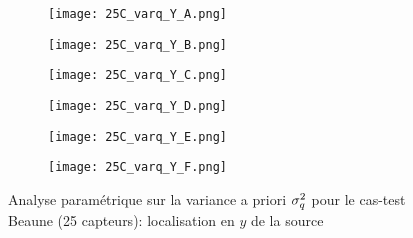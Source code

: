 \begin{figure}[p!]
	\centering
	\begin{subfigure}[t]{0.5\textwidth}
		\centering
		\texttt{[image: 25C\_varq\_Y\_A.png]}
		\caption{}
		\label{varq_A_y}
	\end{subfigure}%
	\begin{subfigure}[t]{0.5\textwidth}
		\centering
		\texttt{[image: 25C\_varq\_Y\_B.png]}
		\caption{}
		\label{varq_B_y}
	\end{subfigure}
	\begin{subfigure}[t]{0.5\textwidth}
		\centering
		\texttt{[image: 25C\_varq\_Y\_C.png]}
		\caption{}
		\label{varq_C_y}
	\end{subfigure}%
	\begin{subfigure}[t]{0.5\textwidth}
		\centering
		\texttt{[image: 25C\_varq\_Y\_D.png]}
		\caption{}
		\label{varq_D_y}
	\end{subfigure}
	\begin{subfigure}[t]{0.5\textwidth}
		\centering
		\texttt{[image: 25C\_varq\_Y\_E.png]}
		\caption{}
		\label{varq_E_y}
	\end{subfigure}%
	\begin{subfigure}[t]{0.5\textwidth}
		\centering
		\texttt{[image: 25C\_varq\_Y\_F.png]}
		\caption{}
		\label{varq_F_y}
	\end{subfigure}
	\caption{Analyse paramétrique sur la variance a priori $\sigma_q^2$ pour le cas-test Beaune (25 capteurs): localisation en $y$ de la source}
	\label{fig_25C_analyse_varq_y}
\end{figure}

